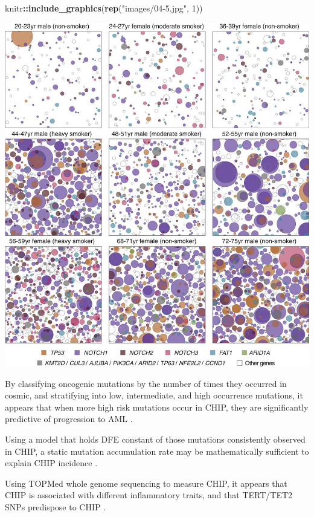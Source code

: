 \documentclass[]{book}
\newenvironment{Shaded}{\begin{snugshade}}{\end{snugshade}}
\newcommand{\DecValTok}[1]{\textcolor[rgb]{0.00,0.00,0.81}{#1}}
\newcommand{\KeywordTok}[1]{\textcolor[rgb]{0.13,0.29,0.53}{\textbf{#1}}}
\newcommand{\NormalTok}[1]{#1}
\newcommand{\OperatorTok}[1]{\textcolor[rgb]{0.81,0.36,0.00}{\textbf{#1}}}
\newcommand{\StringTok}[1]{\textcolor[rgb]{0.31,0.60,0.02}{#1}}
\begin{document}
\begin{Shaded}
\begin{Highlighting}[]
\NormalTok{knitr}\OperatorTok{::}\KeywordTok{include_graphics}\NormalTok{(}\KeywordTok{rep}\NormalTok{(}\StringTok{"images/04-5.jpg"}\NormalTok{, }\DecValTok{1}\NormalTok{))}
\end{Highlighting}
\end{Shaded}

\includegraphics{images/04-5.jpg}

By classifying oncogenic mutations by the number of times they occurred in cosmic, and stratifying into low, intermediate, and high occurrence mutations, it appears that when more high risk mutations occur in CHIP, they are significantly predictive of progression to AML \citep{abelson2018prediction}.

Using a model that holds DFE constant of those mutations consistently observed in CHIP, a static mutation accumulation rate may be mathematically sufficient to explain CHIP incidence \citep{Watson2019-lg}.

Using TOPMed whole genome sequencing to measure CHIP, it appears that CHIP is associated with different inflammatory traits, and that TERT/TET2 SNPs predispose to CHIP \citep{Bick2019-ji}.
\end{document}
